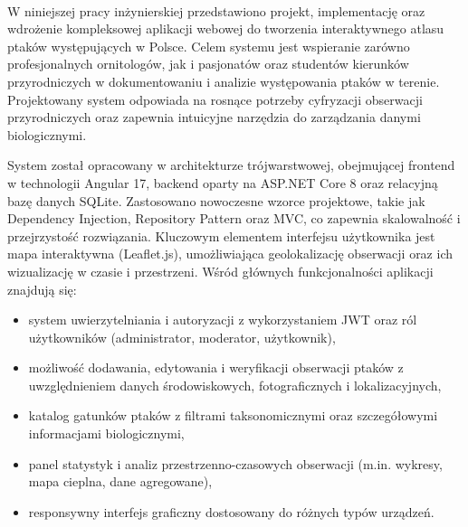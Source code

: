 %


\begin{center}
\\[1cm] 
\end{center}

W niniejszej pracy inżynierskiej przedstawiono projekt, implementację oraz wdrożenie kompleksowej aplikacji webowej do tworzenia interaktywnego atlasu ptaków występujących w Polsce. Celem systemu jest wspieranie zarówno profesjonalnych ornitologów, jak i pasjonatów oraz studentów kierunków przyrodniczych w dokumentowaniu i analizie występowania ptaków w terenie. Projektowany system odpowiada na rosnące potrzeby cyfryzacji obserwacji przyrodniczych oraz zapewnia intuicyjne narzędzia do zarządzania danymi biologicznymi.

System został opracowany w architekturze trójwarstwowej, obejmującej frontend w technologii Angular 17, backend oparty na ASP.NET Core 8 oraz relacyjną bazę danych SQLite. Zastosowano nowoczesne wzorce projektowe, takie jak Dependency Injection, Repository Pattern oraz MVC, co zapewnia skalowalność i przejrzystość rozwiązania. Kluczowym elementem interfejsu użytkownika jest mapa interaktywna (Leaflet.js), umożliwiająca geolokalizację obserwacji oraz ich wizualizację w czasie i przestrzeni.
Wśród głównych funkcjonalności aplikacji znajdują się:
\begin{itemize}
	\item system uwierzytelniania i autoryzacji z wykorzystaniem JWT oraz ról użytkowników (administrator, moderator, użytkownik),
	\item możliwość dodawania, edytowania i weryfikacji obserwacji ptaków z uwzględnieniem danych środowiskowych, fotograficznych i lokalizacyjnych,
	\item katalog gatunków ptaków z filtrami taksonomicznymi oraz szczegółowymi informacjami biologicznymi,
	\item panel statystyk i analiz przestrzenno-czasowych obserwacji (m.in. wykresy, mapa cieplna, dane agregowane),
	\item responsywny interfejs graficzny dostosowany do różnych typów urządzeń.
\end{itemize}

